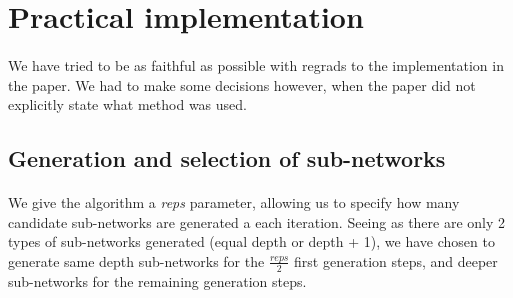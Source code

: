 \documentclass[11 pt]{article}
\begin{document}
\section{Practical implementation}
\paragraph{}We have tried to be as faithful as possible with regrads to the implementation in the paper. We had to make some decisions however, when the paper did not explicitly state what method was used.

\subsection{Generation and selection of sub-networks}
\paragraph{}We give the algorithm a \textit{reps} parameter, allowing us to specify how many candidate sub-networks are generated a each iteration. Seeing as there are only 2 types of sub-networks generated (equal depth or depth + 1), we have chosen to generate same depth sub-networks for the \(\frac{reps}{2}\) first generation steps, and deeper sub-networks for the remaining generation steps.
\end{document}
